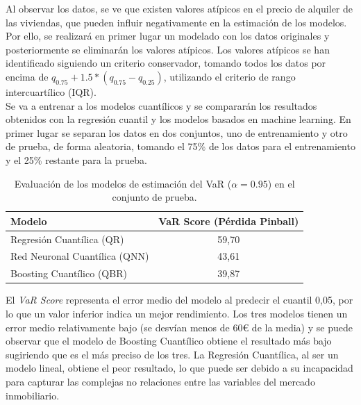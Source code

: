 \documentclass[11pt]{book}
\theoremstyle{plain} %
\theoremstyle{definition} %
\begin{document}
Al observar los datos, se ve que existen valores atípicos en el precio de
alquiler de las viviendas, que pueden influir negativamente en la estimación de 
los modelos. Por ello, se realizará en primer lugar un modelado con los 
datos originales y posteriormente se eliminarán los valores atípicos. Los valores atípicos se han identificado siguiendo un criterio conservador, tomando todos los datos por encima de 
$q_{0.75} + 1.5 * (q_{0.75} - q_{0.25})$, utilizando el criterio de rango intercuartílico
 (IQR).\\ 

Se va a entrenar a los modelos cuantílicos y se compararán los resultados obtenidos con la regresión cuantil y 
los modelos basados en machine learning. En primer lugar se separan 
los datos en dos conjuntos, uno de entrenamiento y otro de prueba, de 
forma aleatoria, tomando el 75\% de los datos para el entrenamiento y 
el 25\% restante para la prueba.

 \begin{table}[h!]
   \centering
   \begin{tabular}{|l|c|}
      \hline
      \textbf{Modelo} & \textbf{VaR Score (Pérdida Pinball)} \\
      \hline
      Regresión Cuantílica (QR) & 59,70 \\
      Red Neuronal Cuantílica (QNN) & 43,61 \\
      Boosting Cuantílico (QBR) & 39,87 \\
      \hline
   \end{tabular}
   \caption{Evaluación de los modelos de estimación del VaR ($\alpha=0.95$) en el conjunto de prueba.}
   \label{tab:var_scores}
 \end{table}              
 
El \textit{VaR Score} representa el error medio del modelo al predecir el cuantil 
0,05, por lo que un valor inferior indica un mejor rendimiento. Los tres modelos 
tienen un error medio relativamente bajo (se desvían menos de 60€ 
de la media) y se puede observar que el modelo de Boosting Cuantílico obtiene el 
resultado más bajo sugiriendo que es el más preciso de los tres. La 
Regresión Cuantílica, al ser un modelo lineal, obtiene el peor resultado, lo 
que puede ser debido a su incapacidad para capturar las complejas no 
relaciones entre las variables del mercado inmobiliario.\\
\end{document}
